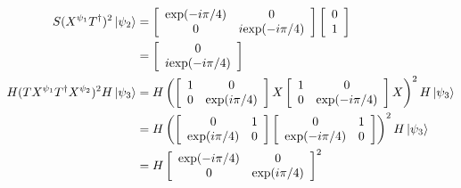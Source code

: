 \documentclass[a4paper,12pt]{article}
\begin{document}
\begin{enumerate}
\begin{align*}
            S (X^{\psi_1} T^\dagger)^2 \ket{\psi_2}
            &= \left[ \begin{array}{cc}
                    \mbox{exp}(-i \pi / 4) & 0 \\
                    0 & i \mbox{exp}(-i \pi / 4)
            \end{array} \right]
            \left[ \begin{array}{c}
                    0 \\
                    1
            \end{array} \right] \\
            &= \left[ \begin{array}{c}
                    0 \\
                    i \mbox{exp}(-i \pi / 4)
            \end{array} \right] \\
            H (T X^{\psi_1} T^\dagger X^{\psi_2})^2 H \ket{\psi_3}
            &= H \left(
            \left[ \begin{array}{cc}
                    1 & 0 \\
                    0 & \mbox{exp}(i \pi / 4)
            \end{array} \right]
            X
            \left[ \begin{array}{cc}
                    1 & 0 \\
                    0 & \mbox{exp}(-i \pi / 4)
            \end{array} \right]
            X
            \right)^2 H \ket{\psi_3} \\
            &= H
            \left(
            \left[ \begin{array}{cc}
                    0 & 1 \\
                    \mbox{exp}(i \pi / 4) & 0
            \end{array} \right]
            \left[ \begin{array}{cc}
                    0 & 1 \\
                    \mbox{exp}(-i \pi / 4) & 0
            \end{array} \right]
            \right)^2 H \ket{\psi_3} \\
            &= H
            \left[ \begin{array}{cc}
                    \mbox{exp}(-i \pi / 4) & 0 \\
                    0 & \mbox{exp}(i \pi / 4)
            \end{array} \right]^2

\end{align*}
\end{enumerate}
\end{document}
